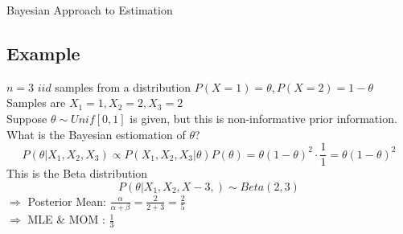 \documentclass[12pt]{article}
\begin{document}
\begin{section}{Bayesian Approach to Estimation}
\subsection{Example}
$n=3$ $iid$ samples from a distribution $P(X=1) = \theta, P(X=2) = 1 - \theta$\\
Samples are $X_1=1, X_2=2, X_3=2$\\

Suppose $\theta \sim Unif[0,1]$ is given, but this is non-informative prior information. \\

What is the Bayesian estiomation of $\theta$?\\
$$P(\theta|X_1,X_2,X_3) \propto P(X_1,X_2,X_3|\theta)P(\theta) = \theta(1-\theta)^2 \cdot \frac{1}{1} = \theta(1-\theta)^2$$
This is the Beta distribution
$$P(\theta|X_1,X_2,X-3,) \sim Beta(2,3)$$
$\Rightarrow$ Posterior Mean: $\frac{\alpha}{\alpha+\beta} = \frac{2}{2+3} = \frac{2}{5}$\\
$\Rightarrow$ MLE \& MOM : $\frac{1}{3}$\\




\end{section}
\end{document}
